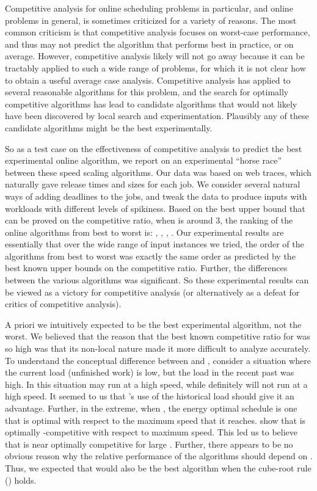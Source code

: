 \documentclass[11pt]{article}
\begin{document}
Competitive analysis for online scheduling problems in particular, and online problems in general,
is sometimes criticized for a variety of reasons. The most common criticism is that competitive
analysis focuses on worst-case performance, and thus may not predict
the algorithm that performs best in practice, or on average. 
However, competitive analysis likely will not go
away because it can be tractably applied to such a wide range of problems, 
for which it is
not clear how to obtain a useful average case analysis.
Competitive analysis has applied to several reasonable 
algorithms for this problem, and
the search
for optimally competitive algorithms has lead to candidate algorithms
that
would not likely have been discovered by local search and
experimentation.
Plausibly any of these candidate algorithms might be the best experimentally.

So as a test case on the effectiveness of competitive analysis to
predict the best experimental online algorithm,
we report on an experimental ``horse race'' between these speed scaling algorithms.
Our data was based on web traces, which naturally gave release times
and sizes for each job.
We consider several natural ways of adding deadlines
to the jobs, and tweak the data to produce inputs with workloads with 
different levels of spikiness. 
Based on the best upper bound that can be proved on the competitive ratio,
when  is around 3, the ranking of the online algorithms from best
to worst is: , , , .
Our experimental results are essentially that over the wide range of input instances we
tried, the order of the algorithms from best to worst was
exactly the same order as predicted by the best known upper bounds on the competitive ratio.
Further, the differences between the various algorithms was
significant.
So these experimental results can be viewed as a victory for competitive analysis (or alternatively
as a defeat for critics of competitive analysis). 


A priori we intuitively expected  to be 
the best experimental algorithm, not the worst. 
We believed that the reason that the best known competitive ratio
for  was so high was that its non-local nature made it more difficult to analyze accurately.
To understand the conceptual difference between  and , consider
a situation where the current load (unfinished work) is low, but the load in the recent past was high.
In this situation  may run at a high speed, while  definitely will not run at a high speed.
It seemed to us that 's use of the historical load should give it an advantage.
Further, in the extreme, when ,
the energy optimal schedule is one that is optimal with respect to the
maximum speed that it reaches. \cite{BKP} show that  is optimally -competitive
with respect to maximum speed. 
This led us to believe that  is near optimally competitive for large .
Further, there appears to be no obvious reason why the relative performance of the algorithms
should depend on . 
Thus, we expected that  would also be the best algorithm when
the cube-root rule () holds.
\end{document}
